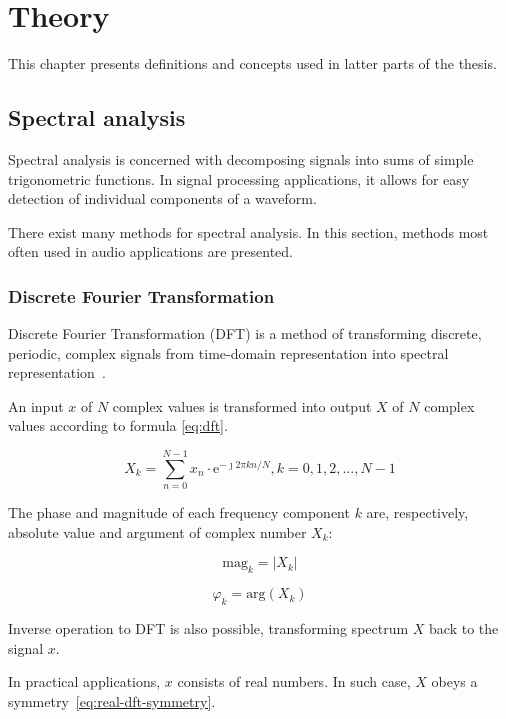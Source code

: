\chapter{Theory}

This chapter presents definitions and concepts used in latter parts of the thesis.

\section{Spectral analysis}

Spectral analysis is concerned with decomposing signals into sums of simple trigonometric functions. In signal processing applications, it allows for easy detection of individual components of a waveform.

There exist many methods for spectral analysis. In this section, methods most often used in audio applications are presented.

\subsection{Discrete Fourier Transformation}
\label{subsec:dft}
Discrete Fourier Transformation (DFT) is a method of transforming discrete, periodic, complex signals from time-domain representation into spectral representation~\cite{DiscreteDSP}.

An input $x$ of $N$ complex values is transformed into output $X$ of $N$ complex values according to formula \ref{eq:dft}.~\cite{JOSDFT}

\begin{equation}
\label{eq:dft}
X_{k} = \sum_{n = 0}^{N-1} x_{n}\cdot {\textrm{e}}^{-\jmath 2\pi kn/N}, k = 0, 1, 2, ..., N - 1
\end{equation}

The phase and magnitude of each frequency component $k$ are, respectively, absolute value and argument of complex number $X_{k}$:

\begin{equation}
\textrm{mag}_{k} = |X_k|
\end{equation}

\begin{equation}
\varphi_{k} = \textrm{arg}(X_k)
\end{equation}

Inverse operation to DFT is also possible, transforming spectrum $X$ back to the signal $x$.

In practical applications, $x$ consists of real numbers. In such case, $X$ obeys a symmetry~\ref{eq:real-dft-symmetry}.

